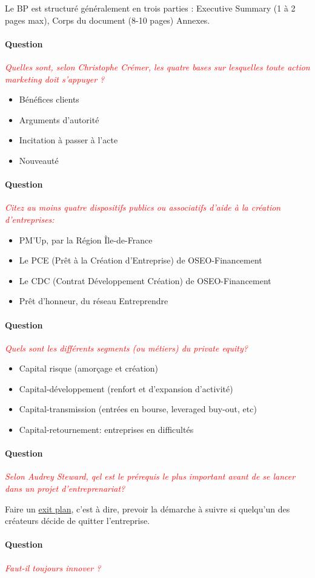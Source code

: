 \documentclass[12pt,oneside,a4paper]{article}
\newcommand{\question}[1]
{
\addtocounter{section}{1}
\paragraph*{Question \thesection}
\emph{\textcolor{red}{#1}}
}
\begin{document}
Le BP est structuré généralement en trois parties : Executive Summary (1 à 2 pages max), Corps du document (8-10 pages) Annexes.
\question{Quelles sont, selon Christophe Crémer, les quatre bases sur lesquelles toute action marketing doit s’appuyer ?}

\begin{itemize}[label=]
	\item Bénéfices clients
	\item Arguments d’autorité
	\item Incitation à passer à l’acte
	\item Nouveauté	
\end{itemize}
\question{Citez au moins quatre dispositifs publics ou associatifs d'aide à la création d'entreprises:}

\begin{itemize}[label=]
    \item PM'Up, par la Région Île-de-France
    \item Le PCE (Prêt à la Création d'Entreprise) de OSEO-Financement
    \item Le CDC (Contrat Développement Création) de OSEO-Financement
    \item Prêt d'honneur, du réseau Entreprendre
\end{itemize}

\question{Quels sont les différents segments (ou métiers) du private equity?}

\begin{itemize}[label=]
	\item Capital risque (amorçage et création)
    \item Capital-développement (renfort et d'expansion d'activité)
    \item Capital-transmission (entrées en bourse, leveraged buy-out, etc)
    \item Capital-retournement: entreprises en difficultés
\end{itemize}

\question{Selon Audrey Steward, qel est le prérequis le plus important avant de se lancer dans un projet d'entreprenariat?}

Faire un \underline{exit plan}, c'est à dire, prevoir la démarche à suivre si quelqu'un des créateurs décide de quitter l'entreprise.
\question{Faut-il toujours innover ?}
\end{document}
